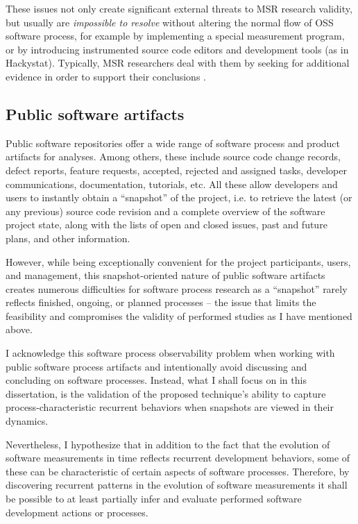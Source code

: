 These issues not only create significant external threats to MSR research validity, but usually are \textit{impossible to resolve}
without altering the normal flow of OSS software process, for example by implementing a special measurement program, 
or by introducing instrumented source code editors and development tools (as in Hackystat). 
Typically, MSR researchers deal with them by seeking for additional evidence in order to support their conclusions 
\cite{citeulike:5043664} \cite{citeulike:5128808}.

\subsection{Public software artifacts}
Public software repositories offer a wide range of software process and product artifacts for analyses.
Among others, these include source code change records, defect reports, feature requests, accepted, 
rejected and assigned tasks, developer communications, documentation, tutorials, etc. 
All these allow developers and users to instantly obtain a ``snapshot'' of the project, i.e. to retrieve the 
latest (or any previous) source code revision and a complete overview of the software project state,
along with the lists of open and closed issues, past and future plans, and other information.

However, while being exceptionally convenient for the project participants, users, and management, this 
snapshot-oriented nature of public software artifacts creates numerous difficulties for software process research 
as a ``snapshot'' rarely reflects finished, ongoing, or planned processes -- the issue that limits the feasibility and 
compromises the validity of performed studies as I have mentioned above. 

I acknowledge this software process observability problem when working with public software process artifacts 
and intentionally avoid discussing and concluding on software processes. Instead, what I shall focus on in this dissertation, 
is the validation of the proposed technique's ability to capture process-characteristic recurrent behaviors when snapshots 
are viewed in their dynamics. 

Nevertheless, I hypothesize that in addition to the fact that the evolution of software measurements in time reflects 
recurrent development behaviors, some of these can be characteristic of certain aspects of software processes. 
Therefore, by discovering recurrent patterns in the evolution of software measurements it shall be possible to at least 
partially infer and evaluate performed software development actions or processes.

